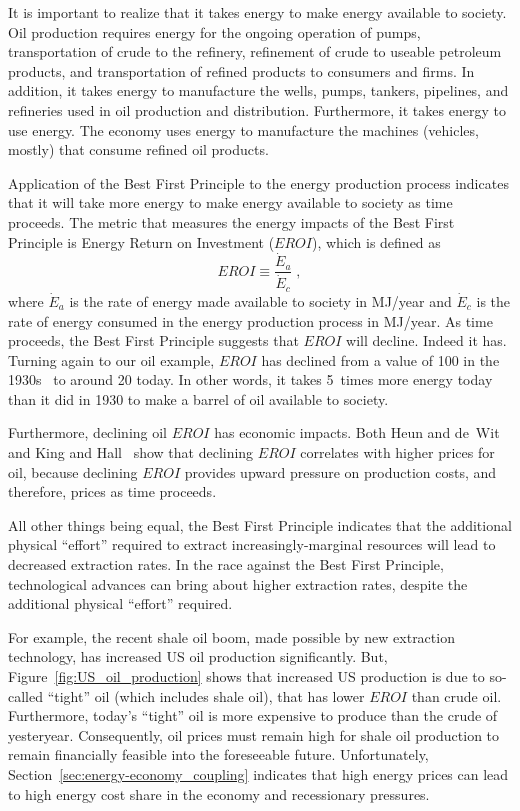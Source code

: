 It is important to realize that it takes energy to make energy available to society.
Oil production requires energy for the ongoing
operation of pumps, 
transportation of crude to the refinery,
refinement of crude to useable petroleum products, and 
transportation of refined products to consumers and firms.
In addition, it takes energy to manufacture the wells, pumps, 
tankers, pipelines, and
refineries used in oil production and distribution.
Furthermore, it takes energy to use energy. 
The economy uses energy to manufacture the machines (vehicles, mostly)
that consume refined oil products.

Application of the Best First Principle to the energy production process 
indicates that it will take more energy 
to make energy available to society as time proceeds.
The metric that measures the energy impacts of the Best First Principle is 
Energy Return on Investment ($EROI$), which is defined as 
%
\begin{equation}
	EROI \equiv \frac{\dot{E}_a}{\dot{E}_c} \; ,
\end{equation}
%
where $\dot{E}_a$ is the rate of energy made available to society in MJ/year
and $\dot{E}_c$ is the rate of energy consumed in the energy production process in MJ/year.
As time proceeds, the Best First Principle suggests that
$EROI$ will decline.
Indeed it has.
Turning again to our oil example, $EROI$ has declined 
from a value of 100 in the 1930s~\cite[p.~781]{Cleveland:2005uy} 
to around 20 today.\cite[Fig.~2]{Hall:2014aa}
In other words, it takes 5~times more energy today
than it did in 1930
to make a barrel of oil available to society.

Furthermore, declining oil $EROI$ has economic impacts.
Both Heun and de~Wit~\cite{Heun:2012ek} and King and Hall~\cite{King:2011go}
show that declining $EROI$ correlates with higher prices for oil, 
because declining $EROI$ provides upward pressure on 
production costs, and therefore, prices
as time proceeds.

All other things being equal, the Best First Principle
indicates that the additional physical ``effort'' required to extract
increasingly-marginal resources will lead to decreased extraction rates.
In the race against the Best First Principle,
technological advances can bring about higher extraction rates, 
despite the additional physical ``effort'' required.

For example, the recent shale oil boom, made possible by new extraction technology,
has increased US oil production significantly. 
But, Figure~\ref{fig:US_oil_production} shows that increased US production
is due to so-called ``tight'' oil (which includes shale oil), 
that has lower $EROI$ than crude oil.
Furthermore, today's ``tight'' oil is more expensive to produce 
than the crude of yesteryear.
Consequently, oil prices must remain high for 
shale oil production to remain financially feasible into the foreseeable future. 
Unfortunately, Section~\ref{sec:energy-economy_coupling} indicates that
high energy prices can lead to high energy cost share in the economy
and recessionary pressures.

